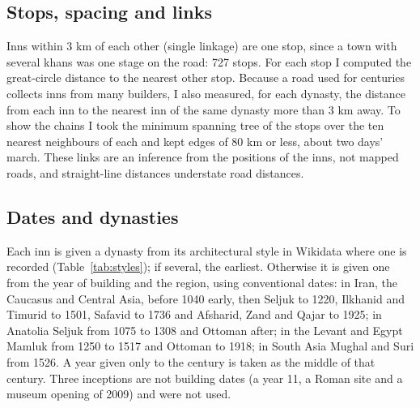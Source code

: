 \documentclass[11pt,a4paper]{article}
\begin{document}
\subsection{Stops, spacing and links}
Inns within 3 km of each other (single linkage) are one stop, since a town with several khans was one stage on the road: 727 stops. For each stop I computed the great-circle distance to the nearest other stop. Because a road used for centuries collects inns from many builders, I also measured, for each dynasty, the distance from each inn to the nearest inn of the same dynasty more than 3 km away. To show the chains I took the minimum spanning tree of the stops over the ten nearest neighbours of each and kept edges of 80 km or less, about two days' march. These links are an inference from the positions of the inns, not mapped roads, and straight-line distances understate road distances.

\subsection{Dates and dynasties}
Each inn is given a dynasty from its architectural style in Wikidata where one is recorded (Table~\ref{tab:styles}); if several, the earliest. Otherwise it is given one from the year of building and the region, using conventional dates: in Iran, the Caucasus and Central Asia, before 1040 early, then Seljuk to 1220, Ilkhanid and Timurid to 1501, Safavid to 1736 and Afsharid, Zand and Qajar to 1925; in Anatolia Seljuk from 1075 to 1308 and Ottoman after; in the Levant and Egypt Mamluk from 1250 to 1517 and Ottoman to 1918; in South Asia Mughal and Suri from 1526. A year given only to the century is taken as the middle of that century. Three inceptions are not building dates (a year 11, a Roman site and a museum opening of 2009) and were not used.
\end{document}
